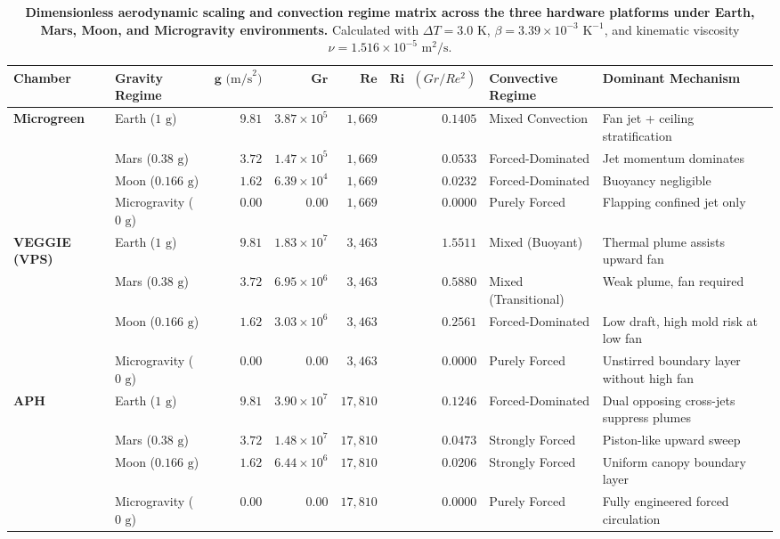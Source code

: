\begin{table}[t]
\centering
\small
\caption{\textbf{Dimensionless aerodynamic scaling and convection regime matrix across the three hardware platforms under Earth, Mars, Moon, and Microgravity environments.} Calculated with $\Delta T = 3.0\text{ K}$, $\beta = 3.39 \times 10^{-3}\text{ K}^{-1}$, and kinematic viscosity $\nu = 1.516 \times 10^{-5}\text{ m}^2/\text{s}$.}
\label{tab:gravity_sweep}
\begin{tabularx}{\textwidth}{llrrrrll}
\toprule
\textbf{Chamber} & \textbf{Gravity Regime} & $\mathbf{g}\text{ (m/s}^2\text{)}$ & $\mathbf{Gr}$ & $\mathbf{Re}$ & $\mathbf{Ri}\text{ } (Gr/Re^2)$ & \textbf{Convective Regime} & \textbf{Dominant Mechanism} \\
\midrule
\textbf{Microgreen} & Earth ($1\text{ g}$) & $9.81$ & $3.87 \times 10^{5}$ & $1,669$ & $0.1405$ & Mixed Convection & Fan jet + ceiling stratification \\
& Mars ($0.38\text{ g}$) & $3.72$ & $1.47 \times 10^{5}$ & $1,669$ & $0.0533$ & Forced-Dominated & Jet momentum dominates \\
& Moon ($0.166\text{ g}$) & $1.62$ & $6.39 \times 10^{4}$ & $1,669$ & $0.0232$ & Forced-Dominated & Buoyancy negligible \\
& Microgravity ($0\text{ g}$) & $0.00$ & $0.00$ & $1,669$ & $0.0000$ & Purely Forced & Flapping confined jet only \\
\midrule
\textbf{VEGGIE (VPS)} & Earth ($1\text{ g}$) & $9.81$ & $1.83 \times 10^{7}$ & $3,463$ & $1.5511$ & Mixed (Buoyant) & Thermal plume assists upward fan \\
& Mars ($0.38\text{ g}$) & $3.72$ & $6.95 \times 10^{6}$ & $3,463$ & $0.5880$ & Mixed (Transitional) & Weak plume, fan required \\
& Moon ($0.166\text{ g}$) & $1.62$ & $3.03 \times 10^{6}$ & $3,463$ & $0.2561$ & Forced-Dominated & Low draft, high mold risk at low fan \\
& Microgravity ($0\text{ g}$) & $0.00$ & $0.00$ & $3,463$ & $0.0000$ & Purely Forced & Unstirred boundary layer without high fan \\
\midrule
\textbf{APH} & Earth ($1\text{ g}$) & $9.81$ & $3.90 \times 10^{7}$ & $17,810$ & $0.1246$ & Forced-Dominated & Dual opposing cross-jets suppress plumes \\
& Mars ($0.38\text{ g}$) & $3.72$ & $1.48 \times 10^{7}$ & $17,810$ & $0.0473$ & Strongly Forced & Piston-like upward sweep \\
& Moon ($0.166\text{ g}$) & $1.62$ & $6.44 \times 10^{6}$ & $17,810$ & $0.0206$ & Strongly Forced & Uniform canopy boundary layer \\
& Microgravity ($0\text{ g}$) & $0.00$ & $0.00$ & $17,810$ & $0.0000$ & Purely Forced & Fully engineered forced circulation \\
\bottomrule
\end{tabularx}
\end{table}
